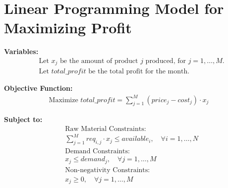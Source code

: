 \documentclass{article}
\begin{document}
\section*{Linear Programming Model for Maximizing Profit}

\textbf{Variables:}
\begin{align*}
& \text{Let } x_j \text{ be the amount of product } j \text{ produced, for } j = 1, \ldots, M. \\
& \text{Let } total\_profit \text{ be the total profit for the month.}
\end{align*}

\textbf{Objective Function:}
\begin{align*}
\text{Maximize } total\_profit = \sum_{j=1}^{M} (price_j - cost_j) \cdot x_j
\end{align*}

\textbf{Subject to:}
\begin{align*}
& \text{Raw Material Constraints:} \\
& \sum_{j=1}^{M} req_{i,j} \cdot x_j \leq available_i, \quad \forall i = 1, \ldots, N \\
& \text{Demand Constraints:} \\
& x_j \leq demand_j, \quad \forall j = 1, \ldots, M \\
& \text{Non-negativity Constraints:} \\
& x_j \geq 0, \quad \forall j = 1, \ldots, M 
\end{align*}
\end{document}
